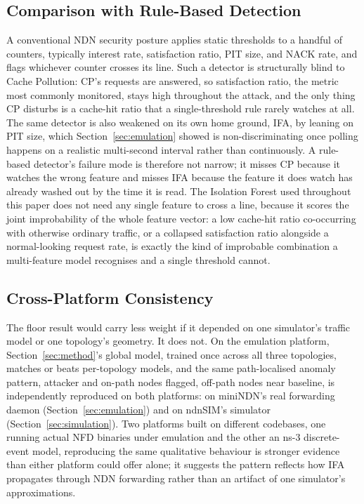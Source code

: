 \subsection{Comparison with Rule-Based Detection}

A conventional NDN security posture applies static thresholds to a handful of counters, typically interest rate, satisfaction ratio, PIT size, and NACK rate, and flags whichever counter crosses its line. Such a detector is structurally blind to Cache Pollution: CP's requests are answered, so satisfaction ratio, the metric most commonly monitored, stays high throughout the attack, and the only thing CP disturbs is a cache-hit ratio that a single-threshold rule rarely watches at all. The same detector is also weakened on its own home ground, IFA, by leaning on PIT size, which Section~\ref{sec:emulation} showed is non-discriminating once polling happens on a realistic multi-second interval rather than continuously. A rule-based detector's failure mode is therefore not narrow; it misses CP because it watches the wrong feature and misses IFA because the feature it does watch has already washed out by the time it is read. The Isolation Forest used throughout this paper does not need any single feature to cross a line, because it scores the joint improbability of the whole feature vector: a low cache-hit ratio co-occurring with otherwise ordinary traffic, or a collapsed satisfaction ratio alongside a normal-looking request rate, is exactly the kind of improbable combination a multi-feature model recognises and a single threshold cannot.

\subsection{Cross-Platform Consistency}

The floor result would carry less weight if it depended on one simulator's traffic model or one topology's geometry. It does not. On the emulation platform, Section~\ref{sec:method}'s global model, trained once across all three topologies, matches or beats per-topology models, and the same path-localised anomaly pattern, attacker and on-path nodes flagged, off-path nodes near baseline, is independently reproduced on both platforms: on miniNDN's real forwarding daemon (Section~\ref{sec:emulation}) and on ndnSIM's simulator (Section~\ref{sec:simulation}). Two platforms built on different codebases, one running actual NFD binaries under emulation and the other an ns-3 discrete-event model, reproducing the same qualitative behaviour is stronger evidence than either platform could offer alone; it suggests the pattern reflects how IFA propagates through NDN forwarding rather than an artifact of one simulator's approximations.

